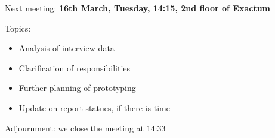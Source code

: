 Next meeting: \textbf{16th March, Tuesday, 14:15, 2nd floor of Exactum}

Topics: 
\begin{itemize}
\item Analysis of interview data
\item Clarification of responsibilities
\item Further planning of prototyping
\item Update on report statues, if there is time
\end{itemize}

Adjournment: we close the meeting at 14:33